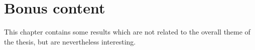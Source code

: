 \chapter{Bonus content}

\label{chap:bonus}

This chapter contains some results which are not related to the overall theme of the thesis, but are nevertheless interesting.





